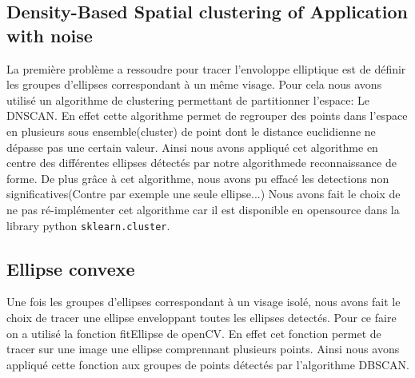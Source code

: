 \documentclass[a4paper,12pt, openany]{book}
\theoremstyle{break}
\begin{document}
\subsection{Density-Based Spatial clustering of Application with noise}
La première problème a ressoudre pour tracer l'envoloppe elliptique est de définir les groupes d'ellipses correspondant à un même visage. Pour cela nous avons utilisé un algorithme de clustering permettant de partitionner l'espace: Le DNSCAN. En effet cette algorithme permet de regrouper des points dans l'espace en plusieurs sous ensemble(cluster) de point dont le distance euclidienne ne dépasse pas une certain valeur. Ainsi nous avons appliqué cet algorithme en centre des différentes ellipses détectés par notre algorithmede reconnaissance de forme.
De plus grâce à cet algorithme, nous avons pu effacé les detections non significatives(Contre par exemple une seule ellipse...)
Nous avons fait le choix de ne pas ré-implémenter cet algorithme car il est disponible en opensource dans la library python \texttt{sklearn.cluster}.

\subsection{Ellipse convexe}
 Une fois les groupes d'ellipses correspondant à un visage isolé, nous avons fait le choix de tracer une ellipse enveloppant toutes les ellipses detectés. Pour ce faire on a utilisé la fonction fitEllipse de openCV. En effet cet fonction permet de tracer sur une image une ellipse comprennant plusieurs points. Ainsi nous avons appliqué cette fonction aux groupes de points détectés par l'algorithme DBSCAN.
\end{document}
